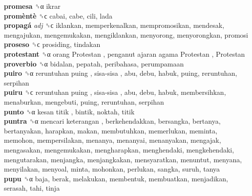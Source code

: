 \textbf{promesa} ␝α  ikrar  \\
\textbf{promèntè} ␝ϲ  cabai, cabe, cili, lada  \\
\textbf{propagá} \emph{adj}  ␝ϲ  iklankan, memperkenalkan, mempromosikan, mendesak, mengajukan, mengemukakan, mengiklankan, menyorong, menyorongkan, promosi  \\
\textbf{proseso} ␝ϲ  prosiding, tindakan  \\
\textbf{protestant} ␝α   orang Protestan ,  penganut ajaran agama Protestan ,  Protestan   \\
\textbf{proverbio} ␝α  bidalan, pepatah, peribahasa, perumpamaan  \\
\textbf{puiro} ␝α   reruntuhan puing ,  sisa-sisa , abu, debu, habuk, puing, reruntuhan, serpihan  \\
\textbf{puiru} ␝ϲ   reruntuhan puing ,  sisa-sisa , abu, debu, habuk, membersihkan, menaburkan, mengebuti, puing, reruntuhan, serpihan  \\
\textbf{punto} ␝α   kesan titik , bintik, noktah, titik  \\
\textbf{puntra} ␝α   mencari keterangan , berkehendakkan, bersangka, bertanya, bertanyakan, harapkan, makan, membutuhkan, memerlukan, meminta, memohon, mempersilakan, menanya, menanyai, menanyakan, mengajak, mengasakan, mengemukakan, mengharapkan, menghendaki, mengkehendaki, mengutarakan, menjangka, menjangkakan, mensyaratkan, menuntut, menyana, menyilakan, menyoal, minta, mohonkan, perlukan, sangka, suruh, tanya  \\
\textbf{pupu} ␝α  baja, berak, melakukan, membentuk, membuatkan, menjadikan, serasah, tahi, tinja  \\
